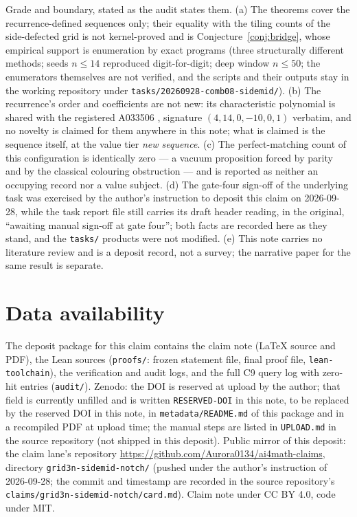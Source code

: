 \documentclass[11pt]{article}
\theoremstyle{definition}
\begin{document}
Grade and boundary, stated as the audit states them. (a) The theorems cover
the recurrence-defined sequences only; their equality with the tiling counts
of the side-defected grid is not kernel-proved and is
Conjecture~\ref{conj:bridge}, whose empirical support is enumeration by exact
programs (three structurally different methods; seeds $n\le 14$ reproduced
digit-for-digit; deep window $n\le 50$; the enumerators themselves are not
verified, and the scripts and their outputs stay in the working repository
under \texttt{tasks/20260928-comb08-sidemid/}). (b) The recurrence's order and
coefficients are not new: its characteristic polynomial is shared with the
registered A033506 \cite{oeis-a033506}, signature $(4,14,0,-10,0,1)$ verbatim,
and no novelty is claimed for them anywhere in this note; what is claimed is
the sequence itself, at the value tier \emph{new sequence}. (c) The
perfect-matching count of this configuration is identically zero --- a vacuum
proposition forced by parity and by the classical colouring obstruction ---
and is reported as neither an occupying record nor a value subject. (d) The
gate-four sign-off of the underlying task was exercised by the author's
instruction to deposit this claim on 2026-09-28, while the task report file
still carries its draft header reading, in the original, ``awaiting manual
sign-off at gate four''; both facts are recorded here as they stand, and the
\texttt{tasks/} products were not modified. (e) This note carries no
literature review and is a deposit record, not a survey; the narrative paper
for the same result is separate.

\section*{Data availability}

The deposit package for this claim contains the claim note (LaTeX source and
PDF), the Lean sources (\texttt{proofs/}: frozen statement file, final proof
file, \texttt{lean-toolchain}), the verification and audit logs, and the full
C9 query log with zero-hit entries (\texttt{audit/}). Zenodo: the DOI is
reserved at upload by the author; that field is currently unfilled and is
written \texttt{RESERVED-DOI} in this note, to be replaced by the reserved
DOI in this note, in \texttt{metadata/README.md} of this package and in a
recompiled PDF at upload time; the manual steps are listed in
\texttt{UPLOAD.md} in the source repository (not shipped in this deposit).
Public mirror of this deposit: the claim lane's repository
\url{https://github.com/Aurora0134/ai4math-claims}, directory
\texttt{grid3n-sidemid-notch/} (pushed under the author's instruction of
2026-09-28; the commit and timestamp are recorded in the source repository's
\texttt{claims/grid3n-sidemid-notch/card.md}). Claim note under CC BY 4.0,
code under MIT.
\end{document}
